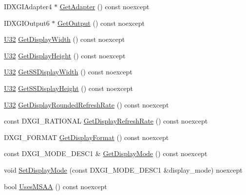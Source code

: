\begin{DoxyCompactItemize}
\item 
I\+D\+X\+G\+I\+Adapter4 $\ast$ \hyperlink{structmage_1_1_display_configuration_a49389d3025f99de828dd3d4d785c6f30}{Get\+Adapter} () const noexcept
\item 
I\+D\+X\+G\+I\+Output6 $\ast$ \hyperlink{structmage_1_1_display_configuration_a63cb03e85bb8c4b2a77106a6c208de3b}{Get\+Output} () const noexcept
\item 
\hyperlink{namespacemage_a41c104c036fba3756a74e19f793eeaa1}{U32} \hyperlink{structmage_1_1_display_configuration_a702c5b21341cd347d94b576a4cf3740a}{Get\+Display\+Width} () const noexcept
\item 
\hyperlink{namespacemage_a41c104c036fba3756a74e19f793eeaa1}{U32} \hyperlink{structmage_1_1_display_configuration_a20ad8e0f250a4e6d144f06b6042a7dee}{Get\+Display\+Height} () const noexcept
\item 
\hyperlink{namespacemage_a41c104c036fba3756a74e19f793eeaa1}{U32} \hyperlink{structmage_1_1_display_configuration_a68418c385c806d3b344c8818f34f9ba2}{Get\+S\+S\+Display\+Width} () const noexcept
\item 
\hyperlink{namespacemage_a41c104c036fba3756a74e19f793eeaa1}{U32} \hyperlink{structmage_1_1_display_configuration_a9f3bec318a03e7f6d2cc8586e5770f43}{Get\+S\+S\+Display\+Height} () const noexcept
\item 
\hyperlink{namespacemage_a41c104c036fba3756a74e19f793eeaa1}{U32} \hyperlink{structmage_1_1_display_configuration_aada8415f1dbebb7f24decc2d5bf030ab}{Get\+Display\+Rounded\+Refresh\+Rate} () const noexcept
\item 
const D\+X\+G\+I\+\_\+\+R\+A\+T\+I\+O\+N\+AL \hyperlink{structmage_1_1_display_configuration_aa92237613f8077d189f9504fec371cb8}{Get\+Display\+Refresh\+Rate} () const noexcept
\item 
D\+X\+G\+I\+\_\+\+F\+O\+R\+M\+AT \hyperlink{structmage_1_1_display_configuration_a412215b18edac3ec6bf18cd00d8c689b}{Get\+Display\+Format} () const noexcept
\item 
const D\+X\+G\+I\+\_\+\+M\+O\+D\+E\+\_\+\+D\+E\+S\+C1 \& \hyperlink{structmage_1_1_display_configuration_a20270be6a17deab929fce25596edabd4}{Get\+Display\+Mode} () const noexcept
\item 
void \hyperlink{structmage_1_1_display_configuration_a23401fc0c20d52d44480c32fc6020e85}{Set\+Display\+Mode} (const D\+X\+G\+I\+\_\+\+M\+O\+D\+E\+\_\+\+D\+E\+S\+C1 \&display\+\_\+mode) noexcept
\item 
bool \hyperlink{structmage_1_1_display_configuration_a86de1a4b64811fce0d5b365924cd2558}{Uses\+M\+S\+AA} () const noexcept

\end{DoxyCompactItemize}
